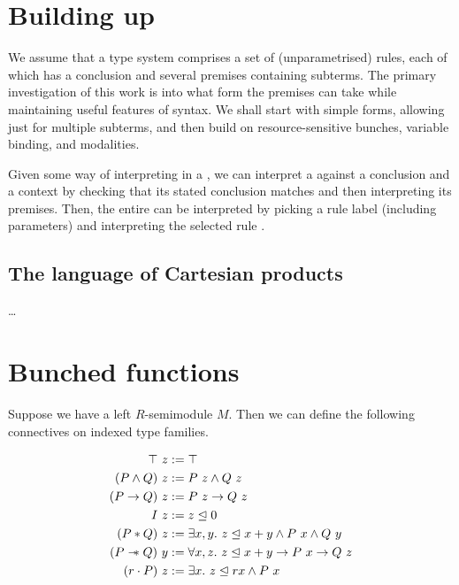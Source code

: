 \documentclass[a4paper]{article}
\begin{document}
\section{Building up}

We assume that a type system comprises a set of (unparametrised) rules, each
of which has a conclusion and several premises containing subterms.
The primary investigation of this work is into what form the premises can take
while maintaining useful features of syntax.
We shall start with simple forms, allowing just for multiple subterms, and
then build on resource-sensitive bunches, variable binding, and modalities.

\System{}
\Rule{}

Given some way  of interpreting
 in a , we can interpret a
 against a conclusion and a context by checking that its
stated conclusion matches and then interpreting its premises.
Then, the entire  can be interpreted by picking a rule
label (including parameters)  and interpreting the selected rule
\AgdaSpace{}.

\semr{}
\sems{}

\subsection{The language of Cartesian products}

\ldots

\section{Bunched functions}

Suppose we have a left $R$-semimodule $M$.
Then we can define the following connectives on indexed type families.

\begin{align*}
  \top~z &:= \top \\
  (P \wedge Q)~z &:= P~z \wedge Q~z \\
  (P \to Q)~z &:= P~z \to Q~z \\
  I~z &:= z \trianglelefteq 0 \\
  (P * Q)~z &:= \exists x,y.~z \trianglelefteq x+y \wedge P~x \wedge Q~y \\
  (P \mathrel{\mathord{-}\hspace{-0.75ex}*} Q)~y &:= \forall x,z.~z \trianglelefteq x+y \to P~x \to Q~z \\
  (r \cdot P)~z &:= \exists x.~z \trianglelefteq rx \wedge P~x
\end{align*}
\end{document}
